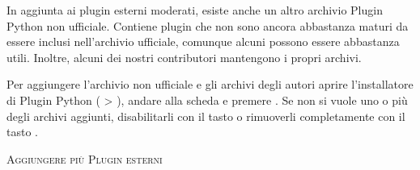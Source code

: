 
In aggiunta ai plugin esterni moderati, esiste anche un altro archivio Plugin Python non ufficiale. Contiene plugin che non sono ancora abbastanza maturi da essere inclusi nell'archivio ufficiale, comunque alcuni possono essere abbastanza utili. Inoltre, alcuni dei nostri contributori mantengono i propri archivi.

Per aggiungere l'archivio non ufficiale e gli archivi degli autori aprire l'installatore di Plugin Python ( > ),
andare alla scheda  e premere . Se non si vuole uno o più degli archivi aggiunti, disabilitarli con il tasto
 o rimuoverli completamente con il tasto .

\begin{Tip} \caption{\textsc{Aggiungere più Plugin esterni}}
\end{Tip}

